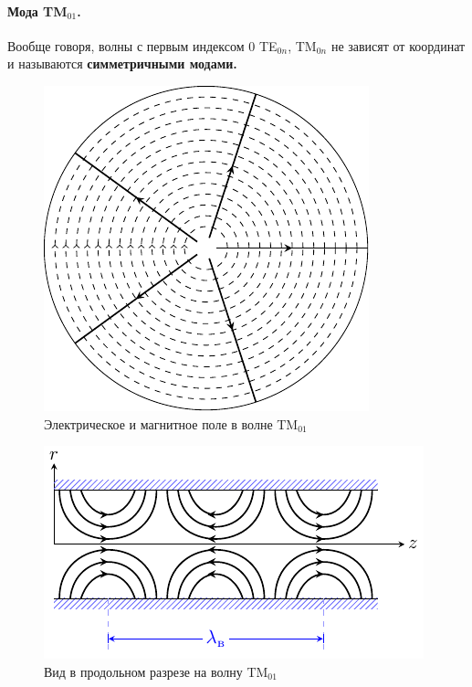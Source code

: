 \paragraph{Мода TM$_{01}$.} Вообще говоря, волны с первым индексом $0$ TE$_{0n}$, TM$_{0n}$ не зависят от координат и называются \textbf{симметричными модами.}
\begin{figure}[H]
	\centering
	\includegraphics[scale=1.25]{img_lect5/cylindric/TM01}
	\caption{Электрическое и магнитное поле в волне TM$_{01}$}
	\label{fig:cylinder:TM01}
\end{figure}

\begin{figure}[H]
	\centering
	\includegraphics[scale=2]{img_lect5/cylindric/TM01z}
	\caption{Вид в продольном разрезе на волну TM$_{01}$}
	\label{fig:cylinder:TM01}
\end{figure}

\newpage
